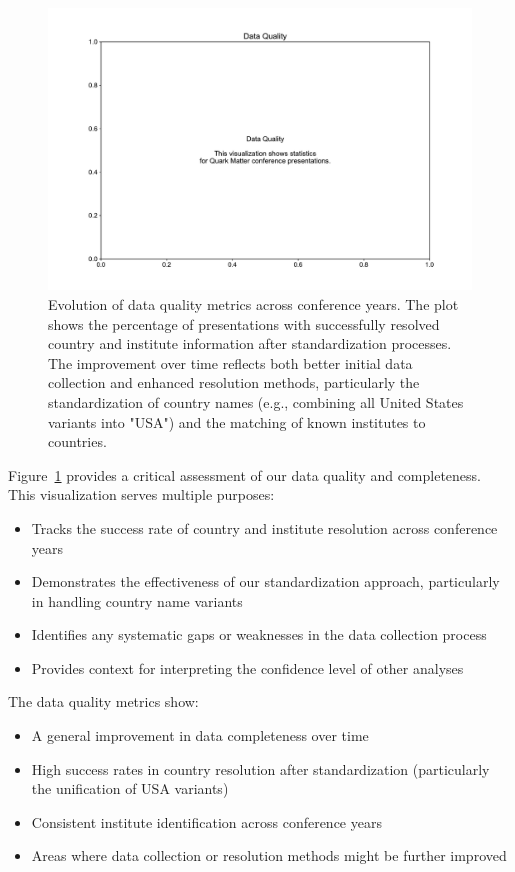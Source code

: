 \documentclass[a4paper,11pt]{article}
\begin{document}
\begin{figure}[H]
\centering
\includegraphics[width=\textwidth]{figures/data_quality.pdf}
\caption{Evolution of data quality metrics across conference years. The plot shows the percentage of presentations with successfully resolved country and institute information after standardization processes. The improvement over time reflects both better initial data collection and enhanced resolution methods, particularly the standardization of country names (e.g., combining all United States variants into "USA") and the matching of known institutes to countries.}
\label{fig:data_quality}
\end{figure}

Figure~\ref{fig:data_quality} provides a critical assessment of our data quality and completeness. This visualization serves multiple purposes:

\begin{itemize}
    \item Tracks the success rate of country and institute resolution across conference years
    \item Demonstrates the effectiveness of our standardization approach, particularly in handling country name variants
    \item Identifies any systematic gaps or weaknesses in the data collection process
    \item Provides context for interpreting the confidence level of other analyses
\end{itemize}

The data quality metrics show:
\begin{itemize}
    \item A general improvement in data completeness over time
    \item High success rates in country resolution after standardization (particularly the unification of USA variants)
    \item Consistent institute identification across conference years
    \item Areas where data collection or resolution methods might be further improved
\end{itemize}
\end{document}
